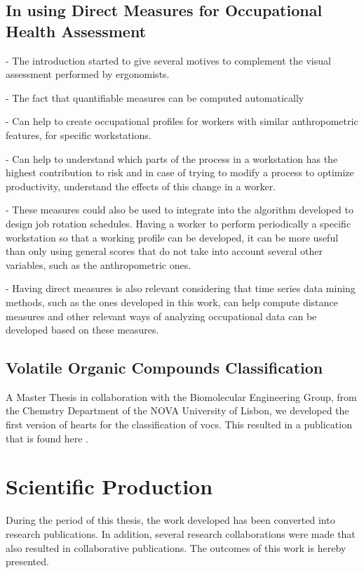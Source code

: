 \subsection{In using Direct Measures for Occupational Health Assessment}

- The introduction started to give several motives to complement the visual assessment performed by ergonomists.

- The fact that quantifiable measures can be computed automatically

- Can help to create occupational profiles for workers with similar anthropometric features, for specific workstations. 

- Can help to understand which parts of the process in a workstation has the highest contribution to risk and in case of trying to modify a process to optimize productivity, understand the effects of this change in a worker. 

- These measures could also be used to integrate into the algorithm developed to design job rotation schedules. Having a worker to perform periodically a specific workstation so that a working profile can be developed, it can be more useful than only using general scores that do not take into account several other variables, such as the anthropometric ones.

- Having direct measures is also relevant considering that time series data mining methods, such as the ones developed in this work, can help compute distance measures and other relevant ways of analyzing occupational data can be developed based on these measures.

\subsection{Volatile Organic Compounds Classification}

A Master Thesis in collaboration with the Biomolecular Engineering Group, from the Chemstry Department of the NOVA University of Lisbon, we developed the first version of \gls{hearts} for the classification of \gls{voc}s. This resulted in a publication that is found here \cite{class_voc}.

\section{Scientific Production}

During the period of this thesis, the work developed has been converted into research publications. In addition, several research collaborations were made that also resulted in collaborative publications. The outcomes of this work is hereby presented.

